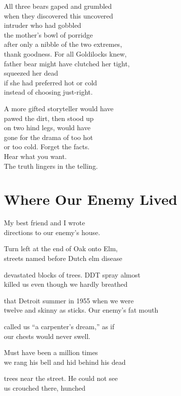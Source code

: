 \documentclass[twoside,10pt]{book}
\begin{document}
All three bears gaped and grumbled\\
when they discovered this uncovered\\
intruder who had gobbled\\
the mother's bowl of porridge\\
after only a nibble of the two extremes,\\
thank goodness. For all Goldilocks knew,\\
father bear might have clutched her tight,\\
squeezed her dead\\
if she had preferred hot or cold\\
instead of choosing just-right.

A more gifted storyteller would have\\
pawed the dirt, then stood up\\
on two hind legs, would have\\
gone for the drama of too hot\\
or too cold. Forget the facts.\\
Hear what you want.\\
The truth lingers in the telling.


\clearpage
\section{Where Our Enemy Lived}

My best friend and I wrote\\
directions to our enemy's house.

Turn left at the end of Oak onto Elm,\\
streets named before Dutch elm disease

devastated blocks of trees. DDT spray almost\\
killed us even though we hardly breathed

that Detroit summer in 1955 when we were\\
twelve and skinny as sticks. Our enemy's fat mouth

called us ``a carpenter's dream,'' as if\\
our chests would never swell.

Must have been a million times\\
we rang his bell and hid behind his dead

trees near the street. He could not see\\
us crouched there, hunched
\end{document}

